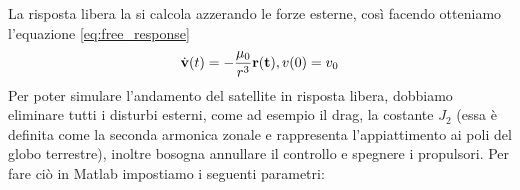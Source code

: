 La risposta libera la si calcola azzerando le forze esterne, così facendo
otteniamo l'equazione \ref{eq:free_response}
\begin{equation}
\dot{\bf v}(t)=-\frac{\mu_0}{r^3}{\bf r(t)}, v(0)=v_0 \nonumber
\end{equation}
Per poter simulare l'andamento del satellite in risposta libera, dobbiamo
eliminare tutti i disturbi esterni, come ad esempio il drag, la costante $J_2$ (essa è definita come
la seconda armonica zonale e rappresenta l'appiattimento ai poli del globo
terrestre), inoltre bosogna annullare il controllo e spegnere i propulsori. Per
fare ciò in Matlab impostiamo i seguenti parametri: 

